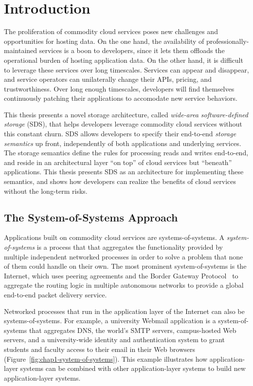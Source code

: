 \chapter{Introduction}
\label{chap:introduction}

The proliferation of commodity cloud services poses new challenges and
opportunities for hosting data.  On the one hand, the availability of
professionally-maintained services is a boon to developers, since it lets them
offloads the operational burden of hosting application data.  On the other
hand, it is difficult to leverage these services over long
timescales.  Services can appear and disappear, and service operators can
unilaterally change their APIs, pricing, and trustworthiness.
Over long enough timescales, developers will find themselves continuously
patching their applications to accomodate new service behaviors.

This thesis presents a novel storage architecture, called \emph{wide-area
software-defined storage} (SDS), that helps developers
leverage commodity cloud services without this constant churn.
SDS allows developers to specify their
end-to-end \emph{storage semantics} up front, independently of
both applications and underlying services.  The storage semantics define the
rules for processing reads and writes end-to-end, and reside in an architectural
layer ``on top'' of cloud services but ``beneath'' applications.
This thesis presents SDS as an architecture for implementing these semantics, and
shows how developers can realize the benefits of cloud services without the
long-term risks.

\section{The System-of-Systems Approach}

Applications built on commodity cloud services are systems-of-systems.
A \emph{system-of-systems} is a process that that aggregates the
functionality provided by multiple independent networked processes
in order to solve a problem that none of them could
handle on their own.  The most prominent system-of-systems 
is the Internet, which uses peering agreements and the Border Gateway
Protocol~\cite{bgp} to aggregate the routing logic in
multiple autonomous networks to provide a global end-to-end packet delivery
service.

Networked processes that run in the application layer of the Internet can also
be systems-of-systems.  For example, a university Webmail
application is a system-of-systems that 
aggregates DNS, the world's SMTP servers, campus-hosted
Web servers, and a university-wide identity and authentication
system to grant students and faculty access to their email in their Web browsers
(Figure~\ref{fig:chap1-system-of-systems}).  This example illustrates
how application-layer systems can be combined with other
application-layer systems to build new application-layer systems.


